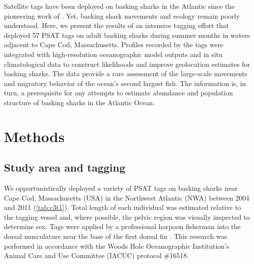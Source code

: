 Satellite tags have been deployed on basking sharks in the Atlantic since the pioneering work of \cite{Priede1984}. Yet, basking shark movements and ecology remain poorly understood. Here, we present the results of an intensive tagging effort that deployed 57 PSAT tags on adult basking sharks during summer months in waters adjacent to Cape Cod, Massachusetts. Profiles recorded by the tags were integrated with high-resolution oceanographic model outputs and in situ climatological data to construct likelihoods and improve geolocation estimates for basking sharks. The data provide a rare assessment of the large-scale movements and migratory behavior of the ocean's second largest fish.  The information is, in turn, a prerequisite for any attempts to estimate abundance and population structure of basking sharks in the Atlantic Ocean.

\section{Methods}
\subsection{Study area and tagging}
We opportunistically deployed a variety of PSAT tags on basking sharks near Cape Cod, Massachusetts (USA) in the Northwest Atlantic (NWA) between 2004 and 2011 (\cref{tab:c3t1}). Total length of each individual was estimated relative to the tagging vessel and, where possible, the pelvic region was visually inspected to determine sex. Tags were applied by a professional harpoon fisherman into the dorsal musculature near the base of the first dorsal fin \citep{Chaprales1998}. This research was performed in accordance with the Woods Hole Oceanographic Institution's Animal Care and Use Committee (IACUC) protocol \#16518.

